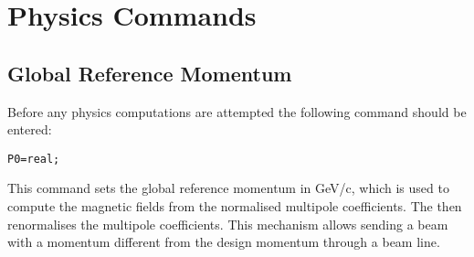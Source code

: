 \chapter{Physics Commands}
\label{chp:physics}
 
\section{Global Reference Momentum}
\label{sec:P0}
Before any physics computations are attempted the following command
should be entered:
\begin{verbatim}
P0=real;
\end{verbatim}
This command sets the global reference momentum in GeV/c,
which is used to compute the magnetic fields from the normalised
multipole coefficients.
The  then renormalises the
multipole coefficients.
This mechanism allows sending a beam with a momentum different from the
design momentum through a beam line.

